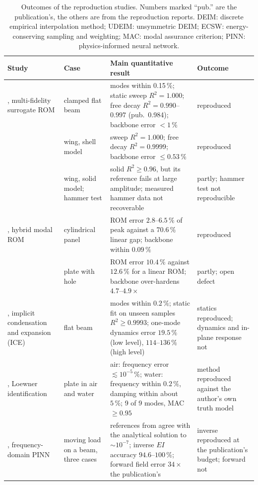 \begin{table}[tbp]
\centering\footnotesize
\setlength{\tabcolsep}{3pt}
\caption{Outcomes of the reproduction studies. Numbers marked ``pub.'' are the publication's, the others are from the reproduction reports. DEIM: discrete empirical interpolation method; UDEIM: unsymmetric DEIM; ECSW: energy-conserving sampling and weighting; MAC: modal assurance criterion; PINN: physics-informed neural network.}\label{tab:vf-repro}
\begin{tabularx}{\linewidth}{@{}>{\raggedright\arraybackslash}p{2.35cm} >{\raggedright\arraybackslash}p{2.4cm} >{\raggedright\arraybackslash}X >{\raggedright\arraybackslash}p{2.35cm}@{}}
\toprule
Study & Case & Main quantitative result & Outcome \\
\midrule
\citet{he2023mfsnlrom}, multi-fidelity surrogate ROM & clamped flat beam & modes within 0.15\,\%; static sweep $R^2=1.000$; free decay $R^2=0.990$--$0.997$ (pub.\ 0.984); backbone error $<1\,\%$ & reproduced \\
 & wing, shell model & sweep $R^2=1.000$; free decay $R^2=0.9999$; backbone error $\le0.53\,\%$ & reproduced \\
 & wing, solid model; hammer test & solid $R^2\ge0.96$, but its reference fails at large amplitude; measured hammer data not recoverable & partly; hammer test not reproducible \\
\addlinespace
\citet{yang2019hybrid}, hybrid modal ROM & cylindrical panel & ROM error $2.8$--$6.5\,\%$ of peak against a $70.6\,\%$ linear gap; backbone within $0.09\,\%$ & reproduced \\
 & plate with hole & ROM error $10.4\,\%$ against $12.6\,\%$ for a linear ROM; backbone over-hardens $4.7$--$4.9\times$ & partly; open defect \\
\addlinespace
\citet{hollkamp2008ice}, implicit condensation and expansion (ICE) & flat beam & modes within $0.2\,\%$; static fit on unseen samples $R^2\ge0.9993$; one-mode dynamics error $19.5\,\%$ (low level), $114$--$136\,\%$ (high level) & statics reproduced; dynamics and in-plane response not \\
\addlinespace
\citet{liu2026fsi}, Loewner identification & plate in air and water & air: frequency error $\lesssim10^{-5}\,\%$; water: frequency within $0.2\,\%$, damping within about $5\,\%$; 9 of 9 modes, MAC $\ge0.95$ & method reproduced against the author's own truth model \\
\addlinespace
\citet{liang2024fdpinn}, frequency-domain PINN & moving load on a beam, three cases & references from \fea{} agree with the analytical solution to $\sim10^{-7}$; inverse $EI$ accuracy $94.6$--$100\,\%$; forward field error $34\times$ the publication's & inverse reproduced at the publication's budget; forward not \\

\end{tabularx}
\end{table}
